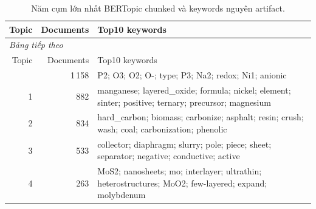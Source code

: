 \begingroup\small\setlength{\tabcolsep}{4pt}\renewcommand{\arraystretch}{1.16}
\begin{longtable}{rrp{.70\linewidth}}
\caption{Năm cụm lớn nhất BERTopic chunked và keywords nguyên artifact.}\label{tab:topic-examples}\\
\toprule Topic & Documents & Top10 keywords \\
\midrule\endfirsthead
\multicolumn{3}{l}{\textit{Bảng tiếp theo}}\\
\toprule Topic & Documents & Top10 keywords \\
\midrule\endhead
\bottomrule\endfoot
0 & 1\,158 & P2; O3; O2; O-; type; P3; Na2; redox; Ni1; anionic \\
1 & 882 & manganese; layered\_oxide; formula; nickel; element; sinter; positive; ternary; precursor; magnesium \\
2 & 834 & hard\_carbon; biomass; carbonize; asphalt; resin; crush; wash; coal; carbonization; phenolic \\
3 & 533 & collector; diaphragm; slurry; pole; piece; sheet; separator; negative; conductive; active \\
4 & 263 & MoS2; nanosheets; mo; interlayer; ultrathin; heterostructures; MoO2; few-layered; expand; molybdenum \\
\end{longtable}\endgroup
{}
